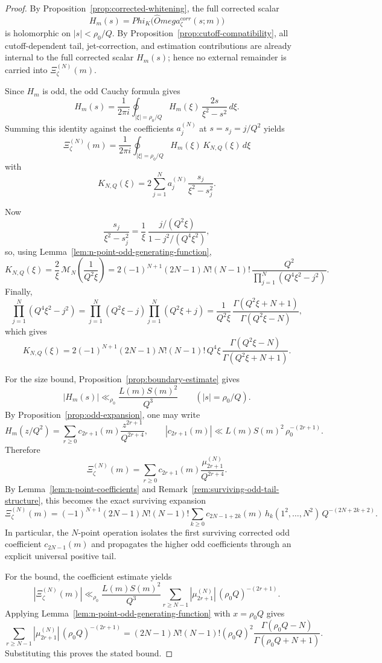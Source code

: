 \documentclass[11pt,a4paper]{amsart}
\def\Omega{Omega}%
\def\Phi{Phi}%
\def\corr{corr}%
\theoremstyle{plain}
\theoremstyle{definition}
\newcommand{\corr}{\mathrm{corr}}
\begin{document}
\begin{proof}
By Proposition~\ref{prop:corrected-whitening}, the full corrected scalar
\[
H_m(s)=\Phi_K\!\bigl(\widehat\Omega_\zeta^{\corr}(s;m)\bigr)
\]
is holomorphic on $|s|<\rho_0/Q$. By
Proposition~\ref{prop:cutoff-compatibility}, all cutoff-dependent tail,
jet-correction, and estimation contributions are already internal to the full
corrected scalar $H_m(s)$; hence no external remainder is carried into
$\Xi_\zeta^{(N)}(m)$.

Since $H_m$ is odd, the odd Cauchy formula gives
\[
H_m(s)
=
\frac{1}{2\pi i}\oint_{|\xi|=\rho_0/Q}
H_m(\xi)\,\frac{2s}{\xi^2-s^2}\,d\xi.
\]
Summing this identity against the coefficients $a_j^{(N)}$ at
$s=s_j=j/Q^2$ yields
\[
\Xi_\zeta^{(N)}(m)
=
\frac{1}{2\pi i}\oint_{|\xi|=\rho_0/Q}
H_m(\xi)\,K_{N,Q}(\xi)\,d\xi
\]
with
\[
K_{N,Q}(\xi)
=
2\sum_{j=1}^N a_j^{(N)}\frac{s_j}{\xi^2-s_j^2}.
\]

Now
\[
\frac{s_j}{\xi^2-s_j^2}
=
\frac{1}{\xi}\,
\frac{j/(Q^2\xi)}{1-j^2/(Q^4\xi^2)},
\]
so, using Lemma~\ref{lem:n-point-odd-generating-function},
\[
K_{N,Q}(\xi)
=
\frac{2}{\xi}\,
\mathcal M_N\!\left(\frac{1}{Q^2\xi}\right)
=
2(-1)^{N+1}(2N-1)N!(N-1)!\,
\frac{Q^2}{\prod_{j=1}^N(Q^4\xi^2-j^2)}.
\]
Finally,
\[
\prod_{j=1}^N(Q^4\xi^2-j^2)
=
\prod_{j=1}^N(Q^2\xi-j)\prod_{j=1}^N(Q^2\xi+j)
=
\frac{1}{Q^2\xi}\,
\frac{\Gamma(Q^2\xi+N+1)}{\Gamma(Q^2\xi-N)},
\]
which gives
\[
K_{N,Q}(\xi)
=
2(-1)^{N+1}(2N-1)N!(N-1)! \, Q^4\xi\,
\frac{\Gamma(Q^2\xi-N)}{\Gamma(Q^2\xi+N+1)}.
\]

For the size bound, Proposition~\ref{prop:boundary-estimate} gives
\[
|H_m(s)|\ll_{\rho_0}\frac{L(m)S(m)^2}{Q^3}
\qquad (|s|=\rho_0/Q).
\]
By Proposition~\ref{prop:odd-expansion}, one may write
\[
H_m(z/Q^2)
=
\sum_{r\ge 0} c_{2r+1}(m)\frac{z^{2r+1}}{Q^{2r+4}},
\qquad
|c_{2r+1}(m)|\ll L(m)S(m)^2\,\rho_0^{-(2r+1)}.
\]
Therefore
\[
\Xi_\zeta^{(N)}(m)
=
\sum_{r\ge 0} c_{2r+1}(m)\frac{\mu_{2r+1}^{(N)}}{Q^{2r+4}}.
\]
By Lemma~\ref{lem:n-point-coefficients} and
Remark~\ref{rem:surviving-odd-tail-structure}, this becomes the exact
surviving expansion
\[
\Xi_\zeta^{(N)}(m)
=
(-1)^{N+1}(2N-1)N!(N-1)!
\sum_{k\ge 0}
c_{2N-1+2k}(m)\,
h_k(1^2,\dots,N^2)\,
Q^{-(2N+2k+2)}.
\]
In particular, the $N$-point operation isolates the first surviving
corrected odd coefficient $c_{2N-1}(m)$ and propagates the higher odd
coefficients through an explicit universal positive tail.

For the bound, the coefficient estimate yields
\[
|\Xi_\zeta^{(N)}(m)|
\ll_{\rho_0}
\frac{L(m)S(m)^2}{Q^3}
\sum_{r\ge N-1}
|\mu_{2r+1}^{(N)}|\,(\rho_0Q)^{-(2r+1)}.
\]
Applying Lemma~\ref{lem:n-point-odd-generating-function} with $x=\rho_0Q$
gives
\[
\sum_{r\ge N-1}
|\mu_{2r+1}^{(N)}|\,(\rho_0Q)^{-(2r+1)}
=
(2N-1)N!(N-1)!(\rho_0Q)^2
\frac{\Gamma(\rho_0Q-N)}{\Gamma(\rho_0Q+N+1)}.
\]
Substituting this proves the stated bound.
\end{proof}
\end{document}

